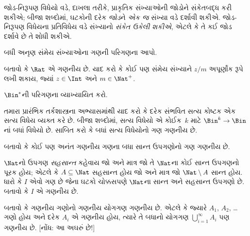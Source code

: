 \begin{explain}
જોડ-નિરૂપણ વિધેયો વડે, દાખલા તરીકે, પ્રાકૃતિક
સંખ્યાઓની જોડોને સંકેતબદ્ધ કરી શકીએ; બીજા શબ્દોમાં,
ઘટકોની દરેક \emph{જોડ}ને \emph{એક જ} સંખ્યા વડે
દર્શાવી શકીએ. જોડ-નિરૂપણ વિધેયના પ્રતિવિધેય વડે
સંખ્યાનો \emph{સંકેત ઉકેલી શકીએ}, એટલે કે તે
કઈ જોડ દર્શાવે છે તે શોધી શકીએ.
\end{explain}

\begin{prob}
બધી અનૃણ સંમેય સંખ્યાઓના ગણની પરિગણના આપો.
\end{prob}

\begin{prob}
બતાવો કે $\Rat$ એ ગણનીય છે.
યાદ કરો કે કોઈ પણ સંમેય સંખ્યાને $z/m$ અપૂર્ણાંક
રૂપે લખી શકાય, જ્યાં $z \in \Int$ અને $m \in \Nat^+$.
\end{prob}

\begin{prob}
$\Bin^*$ની પરિગણના વ્યાખ્યાયિત કરો.
\end{prob}

\begin{prob}
તમારા પ્રારંભિક તર્કશાસ્ત્રના અભ્યાસમાંથી યાદ કરો
કે દરેક સંભવિત સત્ય કોષ્ટક એક સત્ય વિધેય વ્યક્ત
કરે છે. બીજા શબ્દોમાં, સત્ય વિધેયો એ કોઈક~$k$
માટે $\Bin^k \to \Bin$નાં બધાં વિધેયો છે.
સાબિત કરો કે બધાં સત્ય વિધેયોનો ગણ ગણનીય છે.
\end{prob}

\begin{prob}
બતાવો કે કોઈ પણ અનંત ગણનીય ગણના
બધા સાન્ત ઉપગણોનો ગણ ગણનીય છે.
\end{prob}

\begin{prob}
$\Nat$નો ઉપગણ \emph{સહસાન્ત} કહેવાય જો અને માત્ર
જો તે $\Nat$ના કોઈ સાન્ત ઉપગણનો પૂરક હોય; એટલે કે
$A \subseteq \Nat$ સહસાન્ત હોય જો અને માત્ર જો
$\Nat\setminus A$ સાન્ત હોય. ધારો કે $I$ એવો ગણ
છે જેના ઘટકો ચોક્કસપણે $\Nat$ના સાન્ત
અને સહસાન્ત ઉપગણો છે. બતાવો કે $I$ એ ગણનીય છે.
\end{prob}

\begin{prob}
બતાવો કે ગણનીય ગણોનો ગણનીય
યોગગણ ગણનીય છે. એટલે કે જ્યારે
$A_1$, $A_2$, \dots{} ગણો હોય અને દરેક $A_i$
એ ગણનીય હોય, ત્યારે તે બધાનો યોગગણ
$\bigcup_{i=1}^\infty
A_i$ પણ ગણનીય છે. [નોંધ: આ અઘરું છે!]
\end{prob}

